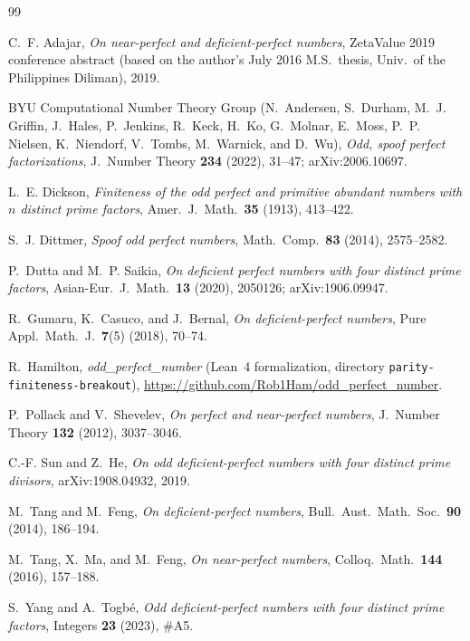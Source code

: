 \documentclass[11pt]{amsart}
\theoremstyle{definition}
\theoremstyle{remark}
\begin{document}
\begin{thebibliography}{99}

C.~F. Adajar, \emph{On near-perfect and deficient-perfect numbers}, ZetaValue 2019 conference abstract (based on the author's July 2016 M.S.\ thesis, Univ.\ of the Philippines Diliman), 2019.

BYU Computational Number Theory Group (N.~Andersen, S.~Durham, M.~J. Griffin, J.~Hales, P.~Jenkins, R.~Keck, H.~Ko, G.~Molnar, E.~Moss, P.~P. Nielsen, K.~Niendorf, V.~Tombs, M.~Warnick, and D.~Wu), \emph{Odd, spoof perfect factorizations}, J.\ Number Theory \textbf{234} (2022), 31--47; arXiv:2006.10697.

L.~E. Dickson, \emph{Finiteness of the odd perfect and primitive abundant numbers with $n$ distinct prime factors}, Amer.\ J.\ Math.\ \textbf{35} (1913), 413--422.

S.~J. Dittmer, \emph{Spoof odd perfect numbers}, Math.\ Comp.\ \textbf{83} (2014), 2575--2582.

P.~Dutta and M.~P. Saikia, \emph{On deficient perfect numbers with four distinct prime factors}, Asian-Eur.\ J.\ Math.\ \textbf{13} (2020), 2050126; arXiv:1906.09947.

R.~Gumaru, K.~Casuco, and J.~Bernal, \emph{On deficient-perfect numbers}, Pure Appl.\ Math.\ J.\ \textbf{7}(5) (2018), 70--74.

R.~Hamilton, \emph{odd\_perfect\_number} (Lean~4 formalization, directory \texttt{parity-finiteness-breakout}), \url{https://github.com/Rob1Ham/odd_perfect_number}.

P.~Pollack and V.~Shevelev, \emph{On perfect and near-perfect numbers}, J.\ Number Theory \textbf{132} (2012), 3037--3046.

C.-F. Sun and Z.~He, \emph{On odd deficient-perfect numbers with four distinct prime divisors}, arXiv:1908.04932, 2019.

M.~Tang and M.~Feng, \emph{On deficient-perfect numbers}, Bull.\ Aust.\ Math.\ Soc.\ \textbf{90} (2014), 186--194.

M.~Tang, X.~Ma, and M.~Feng, \emph{On near-perfect numbers}, Colloq.\ Math.\ \textbf{144} (2016), 157--188.

S.~Yang and A.~Togb\'e, \emph{Odd deficient-perfect numbers with four distinct prime factors}, Integers \textbf{23} (2023), \#A5.

\end{thebibliography}
\end{document}
